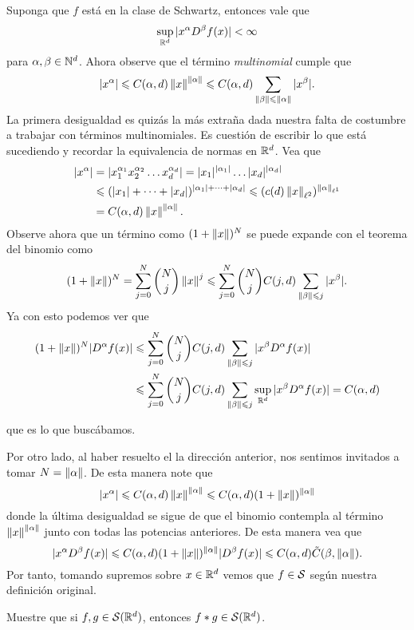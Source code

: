 \documentclass[12pt]{memoir}
\begin{document}
\begin{ptcbp}%
  Suponga que $f$ está en la clase de Schwartz, entonces vale que 
  $$\sup_{\mathbb{R}^d}|x^\alpha D^\beta f(x)|<\infty$$
  para $\alpha,\beta\in\mathbb{N}^d$. Ahora observe que el término \emph{multinomial} cumple que 
  $$|x^\alpha|\leqslant C(\alpha,d)\left\|x\right\|^{\left\|\alpha\right\|}\leqslant C(\alpha,d)\sum_{\left\|\beta\right\|\leqslant\left\|\alpha\right\|}|x^\beta|.$$
  La primera desigualdad es quizás la más extraña dada nuestra falta de costumbre a trabajar con términos multinomiales. Es cuestión de escribir lo que está sucediendo y recordar la equivalencia de normas en $\mathbb{R}^d$. Vea que
  \begin{align*}
    |x^\alpha|&=|x_1^{\alpha_1}x_2^{\alpha_2}\dots x_d^{\alpha_d}|=|x_1|^{|\alpha_1|}\dots|x_d|^{|\alpha_d|}\\
    &\leqslant (|x_1|+\dots+|x_d|)^{|\alpha_1|+\dots+|\alpha_d|}\leqslant (c(d)\left\|x\right\|_{\ell^2})^{\left\|\alpha\right\|_{\ell^1}}\\
    &=C(\alpha,d)\left\|x\right\|^{\left\|\alpha\right\|}.
  \end{align*}
  Observe ahora que un término como $(1+\left\|x\right\|)^N$ se puede expande con el teorema del binomio como 
  $$(1+\left\|x\right\|)^N=\sum_{j=0}^N\binom{N}{j}\left\|x\right\|^j\leqslant\sum_{j=0}^N\binom{N}{j}C(j,d)\sum_{\left\|\beta\right\|\leqslant j}|x^\beta|.$$
  Ya con esto podemos ver que 
  \begin{align*}
    (1+\left\|x\right\|)^N|D^\alpha f(x)|&\leqslant\sum_{j=0}^N\binom{N}{j}C(j,d)\sum_{\left\|\beta\right\|\leqslant j}|x^\beta D^\alpha f(x)|\\
    &\leqslant\sum_{j=0}^N\binom{N}{j}C(j,d)\sum_{\left\|\beta\right\|\leqslant j}\sup_{\mathbb{R}^d}|x^\beta D^\alpha f(x)|=C(\alpha,d)
  \end{align*}
 
  que es lo que buscábamos.\par 
  Por otro lado, al haber resuelto el la dirección anterior, nos sentimos invitados a tomar $N=\left\|\alpha\right\|$. De esta manera note que 
  $$|x^\alpha|\leqslant C(\alpha,d)\left\|x\right\|^{\left\|\alpha\right\|}\leqslant C(\alpha,d)(1+\left\|x\right\|)^{\left\|\alpha\right\|}$$
  donde la última desigualdad se sigue de que el binomio contempla al término $\left\|x\right\|^{\left\|\alpha\right\|}$ junto con todas las potencias anteriores. De esta manera vea que 
  $$|x^\alpha D^\beta f(x)|\leqslant C(\alpha,d)(1+\left\|x\right\|)^{\left\|\alpha\right\|}|D^\beta f(x)|\leqslant C(\alpha,d)\tilde{C}(\beta,\left\|\alpha\right\|).$$
  Por tanto, tomando supremos sobre $x\in\mathbb{R}^d$ vemos que $f\in\mathcal{S}$ según nuestra definición original.
\end{ptcbp}

\begin{Ej}
  Muestre que si $f,g\in\mathcal{S}(\mathbb{R}^d)$, entonces $f\ast g\in\mathcal{S}(\mathbb{R}^d)$.
\end{Ej}
\end{document}
